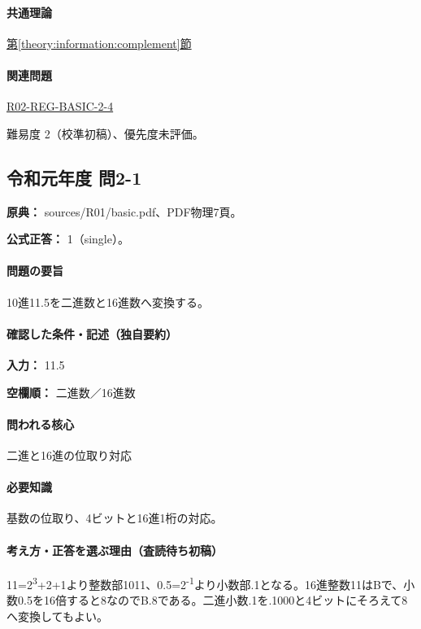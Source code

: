 \paragraph{共通理論} \hyperref[theory:information:complement]{第\ref*{theory:information:complement}節}

\paragraph{関連問題} \hyperref[q:r02-reg-basic-2-4]{R02-REG-BASIC-2-4}

\par 難易度 2（校準初稿）、優先度未評価。

\subsection{令和元年度 問2-1}
\label{q:r01-reg-basic-2-1}

\noindent\textbf{原典：} sources/R01/basic.pdf、PDF物理7頁。

\textbf{公式正答：} 1（single）。

\paragraph{問題の要旨} 10進11.5を二進数と16進数へ変換する。

\paragraph{確認した条件・記述（独自要約）}\mbox{}\par

\noindent\textbf{入力：} 11.5\par

\noindent\textbf{空欄順：} 二進数／16進数\par

\paragraph{問われる核心} 二進と16進の位取り対応

\paragraph{必要知識} 基数の位取り、4ビットと16進1桁の対応。

\paragraph{考え方・正答を選ぶ理由（査読待ち初稿）} 11=\allowbreak{}2\textsuperscript{3}+2+1より整数部1011、0.5=\allowbreak{}2\textsuperscript{-1}より小数部.1となる。16進整数11はBで、小数0.5を16倍すると8なのでB.8である。二進小数.1を.1000と4ビットにそろえて8へ変換してもよい。

